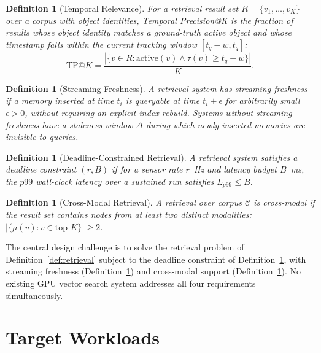 \documentclass[11pt]{article}
\newtheorem{definition}[theorem]{Definition}
\begin{document}
\begin{definition}[Temporal Relevance]
\label{def:temporal_relevance}
For a retrieval result set $R = \{v_1, \ldots, v_K\}$ over a corpus
with object identities, \emph{Temporal Precision@K} is the fraction of
results whose object identity matches a ground-truth active object
\emph{and} whose timestamp falls within the current tracking window
$[t_q - w, t_q]$:
\[
\mathrm{TP@}K = \frac{|\{v \in R : \mathrm{active}(v) \wedge
  \tau(v) \geq t_q - w\}|}{K}.
\]
\end{definition}

\begin{definition}[Streaming Freshness]
\label{def:freshness}
A retrieval system has \emph{streaming freshness} if a memory inserted
at time $t_i$ is queryable at time $t_i + \epsilon$ for arbitrarily
small $\epsilon > 0$, without requiring an explicit index rebuild.
Systems without streaming freshness have a \emph{staleness window}
$\Delta$ during which newly inserted memories are invisible to queries.
\end{definition}

\begin{definition}[Deadline-Constrained Retrieval]
\label{def:deadline}
A retrieval system satisfies a deadline constraint $(r, B)$ if for a
sensor rate $r$~Hz and latency budget $B$~ms, the $p99$ wall-clock
latency over a sustained run satisfies $L_{p99} \leq B$.
\end{definition}

\begin{definition}[Cross-Modal Retrieval]
\label{def:crossmodal}
A retrieval over corpus $\mathcal{C}$ is \emph{cross-modal} if the
result set contains nodes from at least two distinct modalities:
$|\{\mu(v) : v \in \mathrm{top}\text{-}K\}| \geq 2$.
\end{definition}

The central design challenge is to solve the retrieval problem of
Definition~\ref{def:retrieval} subject to the deadline constraint of
Definition~\ref{def:deadline}, with streaming freshness
(Definition~\ref{def:freshness}) and cross-modal support
(Definition~\ref{def:crossmodal}). No existing GPU vector search system
addresses all four requirements simultaneously.

\section{Target Workloads}
\label{sec:workloads}
\end{document}
